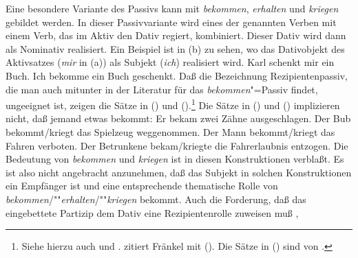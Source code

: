 %

Eine besondere Variante des Passivs kann mit \emph{bekommen},
\emph{erhalten} und \emph{kriegen}
gebildet werden. In dieser Passivvariante wird eines der genannten Verben
mit einem Verb, das im Aktiv den Dativ regiert, kombiniert. Dieser Dativ wird dann
als Nominativ realisiert. Ein Beispiel ist in (b) zu sehen, wo
das Dativobjekt des Aktivsatzes (\emph{mir} in (a)) als Subjekt (\emph{ich})
realisiert wird.
\eal
\ex{}
Karl schenkt mir      ein Buch.
\ex\label{ex-ich-bekommen-ein-buch-geschenkt} 
Ich     bekomme ein Buch       geschenkt.
\zl
Daß die Bezeichnung Rezipientenpassiv, die man auch mitunter in der 
Literatur für das \emph{bekommen}"=Passiv findet,
ungeeignet ist, zeigen die Sätze in () und ().\footnote{
        Siehe hierzu auch  
        und . 
        \citet*[]{Eroms78} zitiert Fränkel %
        mit (). %
        Die Sätze in () sind von \citet*[]{Reis76a}.
}
Die Sätze in () und () implizieren nicht, daß jemand etwas bekommt:
\ea{}
\label{bsp-zaehne-ausgeschlagen}
Er bekam zwei Zähne ausgeschlagen.
\z
\eal
\label{bsp-bekommen-passiv-mit-akk}
\ex
Der Bub bekommt/kriegt das Spielzeug weggenommen.
\ex{}
Der Mann bekommt/kriegt das Fahren  verboten.
\ex{}
Der Betrunkene bekam/kriegte die Fahrerlaubnis     entzogen.
\zl
Die Bedeutung von \emph{bekommen} und \emph{kriegen} ist in diesen
Konstruktionen verblaßt. Es ist also nicht angebracht anzunehmen,
daß das Subjekt in solchen Konstruktionen ein Empfänger ist und
eine entsprechende thematische Rolle von \emph{bekommen}/""\emph{erhalten}/""\emph{kriegen}
bekommt. Auch die Forderung, daß das eingebettete Partizip dem
Dativ eine Rezipientenrolle zuweisen muß \citep[]{Gunkel2003b},
